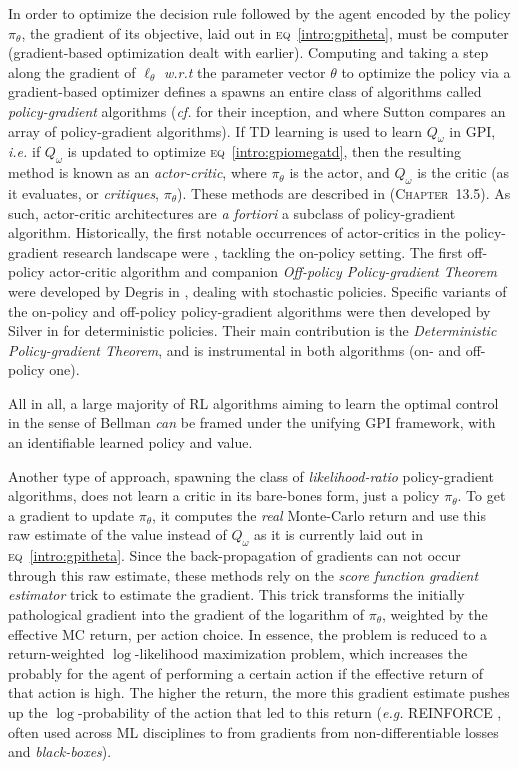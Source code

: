 In order to optimize the decision rule followed by the agent encoded by the policy $\pi_\theta$,
the gradient of its objective, laid out in \textsc{eq}~\ref{intro:gpitheta}, must be computer
(gradient-based optimization dealt with earlier).
Computing and taking a step along the gradient of $\ell_\theta$ \textit{w.r.t} the parameter vector $\theta$
to optimize the policy via a gradient-based optimizer defines a spawns an entire class of algorithms
called \emph{policy-gradient} algorithms (\textit{cf.} \cite{Sutton1999-ii} for their inception,
and \cite{Sutton2001-vh} where Sutton compares an array of policy-gradient algorithms).
If TD learning is used to learn $Q_\omega$ in GPI, \textit{i.e.} if $Q_\omega$ is updated
to optimize \textsc{eq}~\ref{intro:gpiomegatd},
then the resulting method is known as an \emph{actor-critic},
where $\pi_\theta$ is the actor, and $Q_\omega$ is the critic (as it evaluates, or \emph{critiques}, $\pi_\theta$).
These methods are described in \cite{Sutton1998-ow} (\textsc{Chapter}~13.5).
As such, actor-critic architectures are \textit{a fortiori} a subclass of policy-gradient algorithm.
Historically,
the first notable occurrences of actor-critics in the policy-gradient research landscape were
\cite{Konda2000-ef,Peters2005-ve,Bhatnagar2007-bz,Peters2008-mw,Degris2012-qd},
tackling the on-policy setting.
The first off-policy actor-critic algorithm and companion \textit{Off-policy Policy-gradient Theorem}
were developed by Degris in \cite{Degris2012-gv}, dealing with stochastic policies.
Specific variants of the on-policy and off-policy policy-gradient algorithms
were then developed by Silver
in \cite{Silver2014-dk} for deterministic policies.
Their main contribution is the \textit{Deterministic Policy-gradient Theorem},
and is instrumental in both algorithms (on- and off-policy one).

All in all, a large majority of RL algorithms
aiming to learn the optimal control in the sense of Bellman
\emph{can} be framed under
the unifying GPI framework, with an identifiable learned policy and value.

Another type of approach, spawning the class of \textit{likelihood-ratio} policy-gradient algorithms,
does not learn a critic in its bare-bones form, just a policy $\pi_\theta$.
To get a gradient to update $\pi_\theta$,
it computes the \emph{real} Monte-Carlo return
and use this raw estimate of the value instead of $Q_\omega$
as it is currently laid out in \textsc{eq}~\ref{intro:gpitheta}.
Since the back-propagation of gradients can not occur through this raw estimate,
these methods rely on the \emph{score function gradient estimator} trick to estimate the gradient.
This trick transforms the initially pathological gradient into
the gradient of the logarithm of $\pi_\theta$, weighted by the effective MC return, per action choice.
In essence, the problem is reduced to a return-weighted $\log$-likelihood maximization problem,
which increases the probably for the agent of performing a certain action if the effective return of that action
is high. The higher the return, the more this gradient estimate pushes up the $\log$-probability of the action that
led to this return (\textit{e.g.} REINFORCE \cite{Williams1992-xn},
often used across ML disciplines to from gradients from non-differentiable losses and \textit{black-boxes}).
